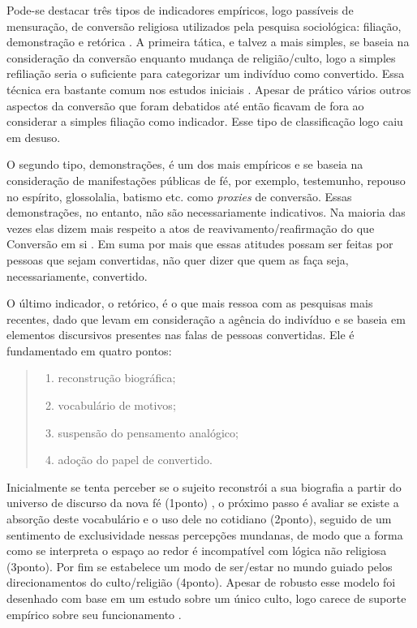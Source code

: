 \documentclass[
	12pt,				%
	oneside,			%
	a4paper,			%
	sumario=tradicional,
	english,			%
	brazil				%
	]{abntex2}
\begin{document}
Pode-se destacar três tipos de indicadores empíricos, logo passíveis de mensuração, de conversão religiosa utilizados pela pesquisa sociológica: filiação, demonstração e retórica \autocite[171]{snow_sociology_1984}. A primeira tática, e talvez a mais simples, se baseia na consideração da conversão enquanto mudança de religião/culto, logo a simples refiliação seria o suficiente para categorizar um indivíduo como convertido. Essa técnica era bastante comum nos estudos iniciais \autocite{newport_religious_1979,roof_denominational_1979}. Apesar de prático vários outros aspectos da conversão que foram debatidos até então ficavam de fora ao considerar a simples filiação como indicador. Esse tipo de classificação logo caiu em desuso.

O segundo tipo, demonstrações, é um dos mais empíricos e se baseia na consideração de manifestações públicas de fé, por exemplo, testemunho, repouso no espírito, glossolalia, batismo etc. como \emph{proxies} de conversão. Essas demonstrações, no entanto, não são necessariamente indicativos. Na maioria das vezes elas dizem mais respeito a atos de reavivamento/reafirmação do que Conversão em si \autocite[172]{snow_sociology_1984}. Em suma por mais que essas atitudes possam ser feitas por pessoas que sejam convertidas, não quer dizer que quem as faça seja, necessariamente, convertido.

O último indicador, o retórico, é o que mais ressoa com as pesquisas mais recentes, dado que levam em consideração a agência do indivíduo e se baseia em elementos discursivos presentes nas falas de pessoas convertidas. Ele é fundamentado em quatro pontos:
\begin{quote}
\begin{enumerate}
\def\labelenumi{\arabic{enumi}.}
\tightlist
\item
  reconstrução biográfica;
\item
  vocabulário de motivos;
\item
  suspensão do pensamento analógico;
\item
  adoção do papel de convertido. \autocite[174-175]{snow_sociology_1984}
\end{enumerate}
\end{quote}
Inicialmente se tenta perceber se o sujeito reconstrói a sua biografia a partir do universo de discurso da nova fé (1\textordmasculine ponto) , o próximo passo é avaliar se existe a absorção deste vocabulário e o uso dele no cotidiano (2\textordmasculine ponto), seguido de um sentimento de exclusividade nessas percepções mundanas, de modo que a forma como se interpreta o espaço ao redor é incompatível com lógica não religiosa (3\textordmasculine ponto). Por fim se estabelece um modo de ser/estar no mundo guiado pelos direcionamentos do culto/religião (4\textordmasculine ponto). Apesar de robusto esse modelo foi desenhado com base em um estudo sobre um único culto, logo carece de suporte empírico sobre seu funcionamento \autocite[175]{snow_sociology_1984}.
\end{document}
